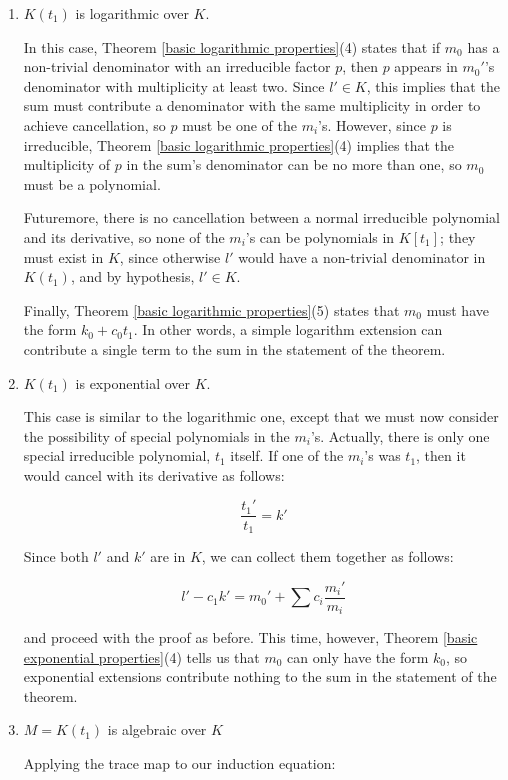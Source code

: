 \begin{enumerate}

\item $K(t_1)$ is logarithmic over $K$.

In this case, Theorem \ref{basic logarithmic properties}(4) states
that if $m_0$ has a non-trivial denominator with an irreducible factor
$p$, then $p$ appears in $m_0'$'s denominator with multiplicity at
least two.  Since $l' \in K$, this implies that the sum must
contribute a denominator with the same multiplicity in order to
achieve cancellation, so $p$ must be one of the $m_i$'s.  However,
since $p$ is irreducible, Theorem \ref{basic logarithmic
properties}(4) implies that the multiplicity of $p$ in the sum's
denominator can be no more than one, so $m_0$ must be a polynomial.

Futuremore, there is no cancellation between a normal irreducible
polynomial and its derivative, so none of the $m_i$'s can be
polynomials in $K[t_1]$; they must exist in $K$, since otherwise
$l'$ would have a non-trivial denominator in $K(t_1)$,
and by hypothesis, $l' \in K$.

Finally, Theorem \ref{basic logarithmic properties}(5) states
that $m_0$ must have the form $k_0 + c_0 t_1$.  In other
words, a simple logarithm extension can contribute a single
term to the sum in the statement of the theorem.

\item $K(t_1)$ is exponential over $K$.

This case is similar to the logarithmic one, except that we must now
consider the possibility of special polynomials in the $m_i$'s.
Actually, there is only one special irreducible polynomial, $t_1$
itself.  If one of the $m_i$'s was $t_1$, then it would cancel
with its derivative as follows:

$$\frac{t_1'}{t_1} = k'$$

Since both $l'$ and $k'$ are in $K$, we can collect them together as follows:

$$l' - c_1 k' = m_0' + \sum c_i \frac{m_i'}{m_i}$$

and proceed with the proof as before.  This time, however,
Theorem \ref{basic exponential properties}(4) tells us that
$m_0$ can only have the form $k_0$, so exponential
extensions contribute nothing to the sum in the statement
of the theorem.

\item $M = K(t_1)$ is algebraic over $K$

Applying the trace map to our induction equation:


\end{enumerate}
